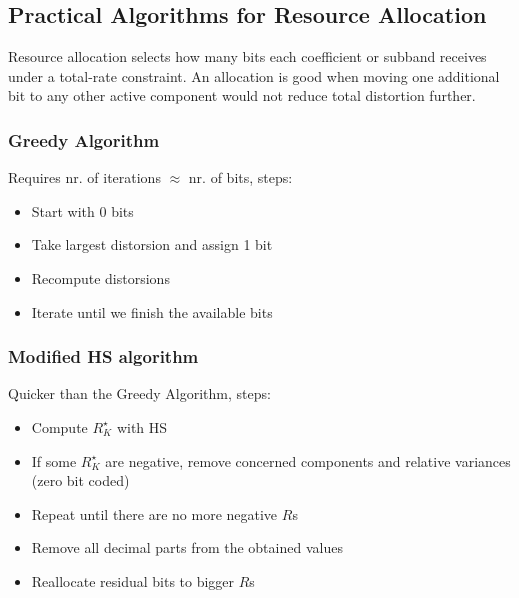 \subsection{Practical Algorithms for Resource Allocation}
Resource allocation selects how many bits each coefficient or subband receives under a total-rate constraint. An allocation is good when moving one additional bit to any other active component would not reduce total distortion further.
\subsubsection{Greedy Algorithm}
Requires nr. of iterations $\approx$ nr. of bits, steps:
\begin{itemize}
    \item Start with $0$ bits
    \item Take largest distorsion and assign 1 bit
    \item Recompute distorsions
    \item Iterate until we finish the available bits
\end{itemize}
\subsubsection{Modified HS algorithm}
Quicker than the Greedy Algorithm, steps:
\begin{itemize}
    \item Compute $R_K^\star$ with HS
    \item If some $R_K^\star$ are negative, remove concerned components and relative variances (zero bit coded)
    \item Repeat until there are no more negative $R$s
    \item Remove all decimal parts from the obtained values
    \item Reallocate residual bits to bigger $R$s
\end{itemize}
